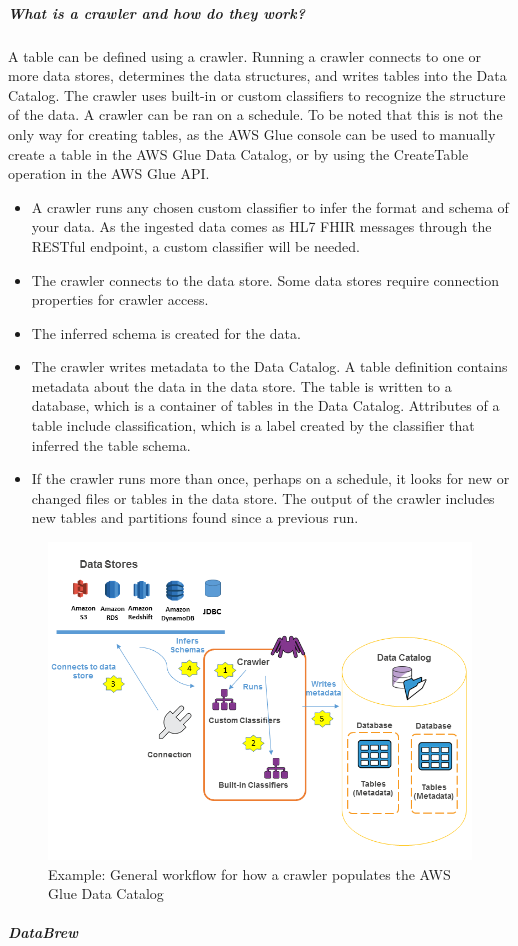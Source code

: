 \documentclass[10pt]{article}
\begin{document}
\subparagraph{What is a crawler and how do they work?}A table can be defined using a crawler. Running a crawler connects to one or more data stores, determines the data structures, and writes tables into the Data Catalog. The crawler uses built-in or custom classifiers to recognize the structure of the data. A crawler can be ran on a schedule. To be noted that this is not the only way for creating tables, as the AWS Glue console can be used to manually create a table in the AWS Glue Data Catalog, or by using the CreateTable operation in the AWS Glue API. \cite{aws-crawlers}
\begin{itemize}
    \item A crawler runs any chosen custom classifier to infer the format and schema of your data. As the ingested data comes as HL7 FHIR messages through the RESTful endpoint, a custom classifier will be needed.
    \item The crawler connects to the data store. Some data stores require connection properties for crawler access.
    \item The inferred schema is created for the data.
    \item The crawler writes metadata to the Data Catalog. A table definition contains metadata about the data in the data store. The table is written to a database, which is a container of tables in the Data Catalog. Attributes of a table include classification, which is a label created by the classifier that inferred the table schema.
    \item If the crawler runs more than once, perhaps on a schedule, it looks for new or changed files or tables in the data store. The output of the crawler includes new tables and partitions found since a previous run.
\end{itemize}
\begin{figure}[h!]
	\centering
	\includegraphics[width=0.9\linewidth]{images/PopulateCatalog-overview.png}
	\caption*{Example: General workflow for how a crawler populates the AWS Glue Data Catalog}
\end{figure}
\subparagraph{DataBrew}
\end{document}
